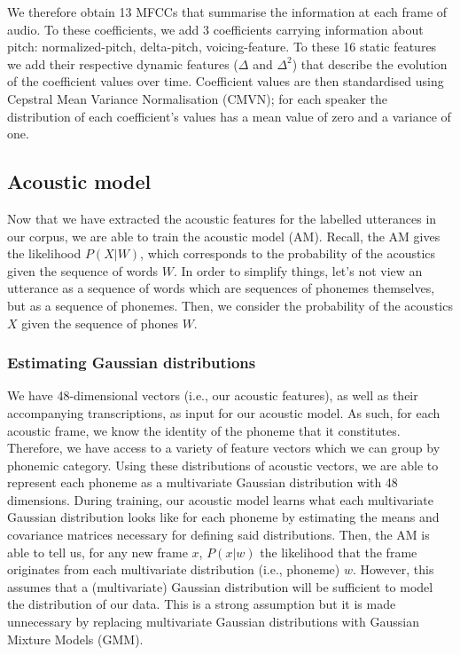 We therefore obtain 13 MFCCs that summarise the information at each frame of audio. To these coefficients, we add 3 coefficients carrying information about pitch: normalized-pitch, delta-pitch, voicing-feature.
To these 16 static features we add their respective dynamic features ($\Delta$ and $\Delta^2$) that describe the evolution of the coefficient values over time. 
Coefficient values are then standardised using Cepstral Mean Variance Normalisation (CMVN); for each speaker the distribution of each coefficient's values has a mean value of zero and a variance of one. 

\subsection{Acoustic model}

Now that we have extracted the acoustic features for the labelled utterances in our corpus, we are able to train the acoustic model (AM). Recall, the AM gives the likelihood $P(X|W)$, which corresponds to the probability of the acoustics given the sequence of words $W$.
In order to simplify things, let's not view an utterance as a sequence of words which are sequences of phonemes themselves, but as a sequence of phonemes. Then, we consider the probability of the acoustics $X$ given the sequence of phones $W$.

\subsubsection{Estimating Gaussian distributions}
We have 48-dimensional vectors (i.e., our acoustic features), as well as their accompanying transcriptions, as input for our acoustic model. As such, for each acoustic frame, we know the identity of the phoneme that it constitutes. Therefore, we have access to a variety of feature vectors which we can group by phonemic category. Using these distributions of acoustic vectors, we are able to represent each phoneme as a multivariate Gaussian distribution with 48 dimensions. During training, our acoustic model learns what each multivariate Gaussian distribution looks like for each phoneme by estimating the means and covariance matrices necessary for defining said distributions.
Then, the AM is able to tell us, for any new frame $x$, $P(x|w)$ the likelihood that the frame originates from each multivariate distribution (i.e., phoneme) $w$. However, this assumes that a (multivariate) Gaussian distribution will be sufficient to model the distribution of our data. This is a strong assumption but it is made unnecessary by replacing multivariate Gaussian distributions with Gaussian Mixture Models (GMM).

